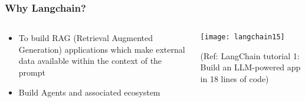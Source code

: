 \begin{frame}[fragile]\frametitle{Why Langchain?}

  \begin{columns}
    \begin{column}{0.5\textwidth}
      \begin{itemize}
        \item To build RAG (Retrieval Augmented Generation) applications which make external data available within the context of the prompt
		\item Build Agents and associated ecosystem

      \end{itemize}
    \end{column}
    \begin{column}{0.5\textwidth}
			\begin{center}
			\texttt{[image: langchain15]}
			\end{center}	  


			{\tiny (Ref: LangChain tutorial 1: Build an LLM-powered app in 18 lines of code)}
			
		
    \end{column}
  \end{columns}

\end{frame}

